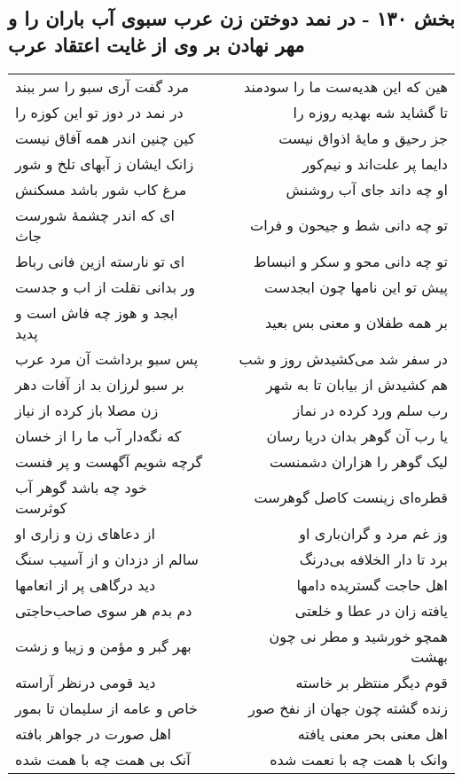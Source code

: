 \begin{center}
\section*{بخش ۱۳۰ - در نمد دوختن زن عرب سبوی آب باران را و مهر نهادن بر وی از غایت اعتقاد عرب}
\label{sec:sh130}
\begin{longtable}{l p{0.5cm} r}
مرد گفت آری سبو را سر ببند
&&
هین که این هدیه‌ست ما را سودمند
\\
در نمد در دوز تو این کوزه را
&&
تا گشاید شه بهدیه روزه را
\\
کین چنین اندر همه آفاق نیست
&&
جز رحیق و مایهٔ اذواق نیست
\\
زانک ایشان ز آبهای تلخ و شور
&&
دایما پر علت‌اند و نیم‌کور
\\
مرغ کاب شور باشد مسکنش
&&
او چه داند جای آب روشنش
\\
ای که اندر چشمهٔ شورست جاث
&&
تو چه دانی شط و جیحون و فرات
\\
ای تو نارسته ازین فانی رباط
&&
تو چه دانی محو و سکر و انبساط
\\
ور بدانی نقلت از اب و جدست
&&
پیش تو این نامها چون ابجدست
\\
ابجد و هوز چه فاش است و پدید
&&
بر همه طفلان و معنی بس بعید
\\
پس سبو برداشت آن مرد عرب
&&
در سفر شد می‌کشیدش روز و شب
\\
بر سبو لرزان بد از آفات دهر
&&
هم کشیدش از بیابان تا به شهر
\\
زن مصلا باز کرده از نیاز
&&
رب سلم ورد کرده در نماز
\\
که نگه‌دار آب ما را از خسان
&&
یا رب آن گوهر بدان دریا رسان
\\
گرچه شویم آگهست و پر فنست
&&
لیک گوهر را هزاران دشمنست
\\
خود چه باشد گوهر آب کوثرست
&&
قطره‌ای زینست کاصل گوهرست
\\
از دعاهای زن و زاری او
&&
وز غم مرد و گران‌باری او
\\
سالم از دزدان و از آسیب سنگ
&&
برد تا دار الخلافه بی‌درنگ
\\
دید درگاهی پر از انعامها
&&
اهل حاجت گستریده دامها
\\
دم بدم هر سوی صاحب‌حاجتی
&&
یافته زان در عطا و خلعتی
\\
بهر گبر و مؤمن و زیبا و زشت
&&
همچو خورشید و مطر نی چون بهشت
\\
دید قومی درنظر آراسته
&&
قوم دیگر منتظر بر خاسته
\\
خاص و عامه از سلیمان تا بمور
&&
زنده گشته چون جهان از نفخ صور
\\
اهل صورت در جواهر بافته
&&
اهل معنی بحر معنی یافته
\\
آنک بی همت چه با همت شده
&&
وانک با همت چه با نعمت شده
\\
\end{longtable}
\end{center}
